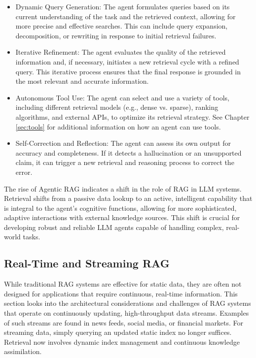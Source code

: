 \begin{itemize}
    \item Dynamic Query Generation: The agent formulates queries based on its current understanding of the task and the retrieved context, allowing for more precise and effective searches. This can include query expansion, decomposition, or rewriting in response to initial retrieval failures.
    \item Iterative Refinement: The agent evaluates the quality of the retrieved information and, if necessary, initiates a new retrieval cycle with a refined query. This iterative process ensures that the final response is grounded in the most relevant and accurate information.
    \item Autonomous Tool Use: The agent can select and use a variety of tools, including different retrieval models (e.g., dense vs. sparse), ranking algorithms, and external APIs, to optimize its retrieval strategy. See Chapter \ref{sec:tools} for additional information on how an agent can use tools.
    \item Self-Correction and Reflection: The agent can assess its own output for accuracy and completeness. If it detects a hallucination or an unsupported claim, it can trigger a new retrieval and reasoning process to correct the error.
\end{itemize}
%
The rise of Agentic RAG indicates a  shift in the role of RAG in LLM systems. Retrieval shifts from a passive data lookup to an active, intelligent capability that is integral to the agent's cognitive functions, allowing for more sophisticated, adaptive interactions with external knowledge sources. This shift is crucial for developing robust and reliable LLM agents capable of handling complex, real-world tasks.



\subsection{Real-Time and Streaming RAG}

While traditional RAG systems are effective for static data, they are often not designed for applications that require continuous, real-time information. This section looks into the architectural considerations and challenges of RAG systems that operate on continuously updating, high-throughput data streams. Examples of such streams are found in news feeds, social media, or financial markets. For streaming data, simply querying an updated static index no longer suffices. Retrieval now involves dynamic index management and continuous knowledge assimilation.

